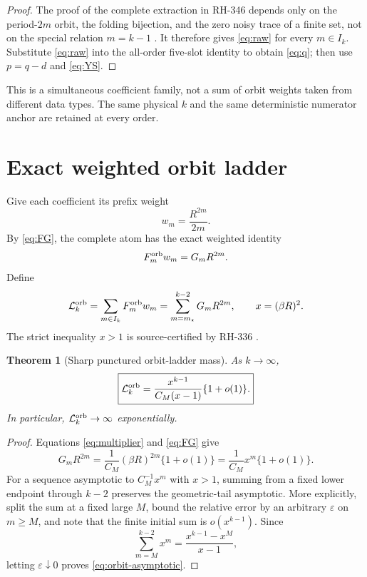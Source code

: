 \documentclass[11pt]{article}
\newtheorem{theorem}{Theorem}[section]
\theoremstyle{remark}
\newcommand{\cL}{\mathcal L}
\begin{document}
\begin{proof}
The proof of the complete extraction in RH-346 depends only on the
period-$2m$ orbit, the folding bijection, and the zero noisy trace of a finite
set, not on the special relation $m=k-1$
\citep{WangCompleteLower2026}.  It therefore gives \eqref{eq:raw} for every
$m\in I_k$.  Substitute \eqref{eq:raw} into the all-order five-slot identity
to obtain \eqref{eq:q}; then use $p=q-d$ and \eqref{eq:YS}.
\end{proof}

This is a simultaneous coefficient family, not a sum of orbit weights taken
from different data types.  The same physical $k$ and the same deterministic
numerator anchor are retained at every order.

\section{Exact weighted orbit ladder}

Give each coefficient its prefix weight
\begin{equation}\label{eq:weight}
 w_m=\frac{R^{2m}}{2m}.
\end{equation}
By \eqref{eq:FG}, the complete atom has the exact weighted identity
\begin{equation}\label{eq:weighted-identity}
 F_m^{\rm orb}w_m=G_mR^{2m}.
\end{equation}
Define
\begin{equation}\label{eq:L-orb}
 \cL_k^{\rm orb}
 =\sum_{m\in I_k}F_m^{\rm orb}w_m
 =\sum_{m=m_\star}^{k-2}G_mR^{2m},
 \qquad x=(\beta R)^2.
\end{equation}
The strict inequality $x>1$ is source-certified by RH-336
\citep{WangProjectorMass2026}.

\begin{theorem}[Sharp punctured orbit-ladder mass]\label{thm:orbit-mass}
As $k\to\infty$,
\begin{equation}\label{eq:orbit-asymptotic}
 \boxed{
 \cL_k^{\rm orb}
 =\frac{x^{k-1}}{C_M(x-1)}\{1+o(1)\}.}
\end{equation}
In particular, $\cL_k^{\rm orb}\to\infty$ exponentially.
\end{theorem}

\begin{proof}
Equations \eqref{eq:multiplier} and \eqref{eq:FG} give
\[
 G_mR^{2m}
 =\frac1{C_M}(\beta R)^{2m}\{1+o(1)\}
 =\frac1{C_M}x^m\{1+o(1)\}.
\]
For a sequence asymptotic to $C_M^{-1}x^m$ with $x>1$, summing from a fixed
lower endpoint through $k-2$ preserves the geometric-tail asymptotic.  More
explicitly, split the sum at a fixed large $M$, bound the relative error by
an arbitrary $\varepsilon$ on $m\ge M$, and note that the finite initial sum
is $o(x^{k-1})$.  Since
\[
 \sum_{m=M}^{k-2}x^m
 =\frac{x^{k-1}-x^M}{x-1},
\]
letting $\varepsilon\downarrow0$ proves \eqref{eq:orbit-asymptotic}.
\end{proof}
\end{document}
